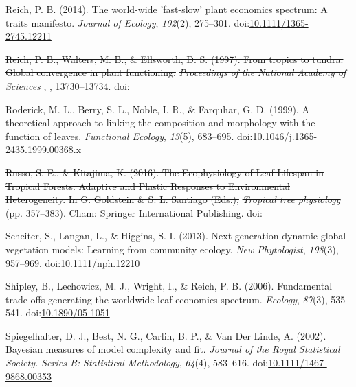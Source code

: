 \documentclass[12pt,]{article}
\theoremstyle{definition}
\theoremstyle{definition}
\theoremstyle{definition}
\theoremstyle{remark}
\providecommand{\DIFdeltex}[1]{{\protect\color{red}\sout{#1}}}                      %
\providecommand{\DIFdelbegin}{} %
\providecommand{\DIFdelend}{} %
\providecommand{\DIFdel}[1]{\texorpdfstring{\DIFdeltex{#1}}{}} %
\newcommand{\DIFscaledelfig}{0.5}
\newlength{\DIFdelgraphicswidth} %
\newlength{\DIFdelgraphicsheight} %
\newcommand{\DIFdelincludegraphics}[2][]{%
\sbox{\DIFdelgraphicsbox}{\DIFOincludegraphics[#1]{#2}}%
\settoboxwidth{\DIFdelgraphicswidth}{\DIFdelgraphicsbox} %
\settoboxtotalheight{\DIFdelgraphicsheight}{\DIFdelgraphicsbox} %
\scalebox{\DIFscaledelfig}{%
\parbox[b]{\DIFdelgraphicswidth}{\usebox{\DIFdelgraphicsbox}\\[-\baselineskip] \rule{\DIFdelgraphicswidth}{0em}}\llap{\resizebox{\DIFdelgraphicswidth}{\DIFdelgraphicsheight}{%
\setlength{\unitlength}{\DIFdelgraphicswidth}%
\begin{picture}(1,1)%
\thicklines\linethickness{2pt} %
{\color[rgb]{1,0,0}\put(0,0){\framebox(1,1){}}}%
{\color[rgb]{1,0,0}\put(0,0){\line( 1,1){1}}}%
{\color[rgb]{1,0,0}\put(0,1){\line(1,-1){1}}}%
\end{picture}%
}\hspace*{3pt}}} %
} %
\DeclareRobustCommand{\DIFdelbegin}{\DIFOdelbegin \let\includegraphics\DIFdelincludegraphics} %
\DeclareRobustCommand{\DIFdelend}{\DIFOaddend \let\includegraphics\DIFOincludegraphics} %
\begin{document}
\begin{itemize}
\leavevmode\hypertarget{ref-Reich2014}{}%
Reich, P. B. (2014). The world-wide 'fast-slow' plant economics
spectrum: A traits manifesto. \emph{Journal of Ecology}, \emph{102}(2),
275--301.
doi:\href{https://doi.org/10.1111/1365-2745.12211}{10.1111/1365-2745.12211}

\leavevmode\DIFdelbegin %
\DIFdel{Reich, P. B., Walters, M. B., \& Ellsworth, D. S. (1997). From tropics
to tundra: Global convergence in plant functioning. }\emph{\DIFdel{Proceedings of
the National Academy of Sciences}}%
\DIFdel{, }%
\DIFdel{, 13730--13734.
doi:}%

\DIFdelend \hypertarget{ref-Roderick1999}{}%
Roderick, M. L., Berry, S. L., Noble, I. R., \& Farquhar, G. D. (1999).
A theoretical approach to linking the composition and morphology with
the function of leaves. \emph{Functional Ecology}, \emph{13}(5),
683--695.
doi:\href{https://doi.org/10.1046/j.1365-2435.1999.00368.x}{10.1046/j.1365-2435.1999.00368.x}

\leavevmode\DIFdelbegin %
\DIFdel{Russo, S. E., \& Kitajima, K. (2016). The Ecophysiology of Leaf Lifespan
in Tropical Forests: Adaptive and Plastic Responses to Environmental
Heterogeneity. In G. Goldstein \& S. L. Santiago (Eds.), }\emph{\DIFdel{Tropical
tree physiology}} %
\DIFdel{(pp. 357--383). Cham: Springer International
Publishing.
doi:}%

\DIFdelend \hypertarget{ref-Scheiter2013}{}%
Scheiter, S., Langan, L., \& Higgins, S. I. (2013). Next-generation
dynamic global vegetation models: Learning from community ecology.
\emph{New Phytologist}, \emph{198}(3), 957--969.
doi:\href{https://doi.org/10.1111/nph.12210}{10.1111/nph.12210}

\leavevmode\hypertarget{ref-Shipley2006}{}%
Shipley, B., Lechowicz, M. J., Wright, I., \& Reich, P. B. (2006).
Fundamental trade-offs generating the worldwide leaf economics spectrum.
\emph{Ecology}, \emph{87}(3), 535--541.
doi:\href{https://doi.org/10.1890/05-1051}{10.1890/05-1051}

\leavevmode\hypertarget{ref-Spiegelhalter2002}{}%
Spiegelhalter, D. J., Best, N. G., Carlin, B. P., \& Van Der Linde, A.
(2002). Bayesian measures of model complexity and fit. \emph{Journal of
the Royal Statistical Society. Series B: Statistical Methodology},
\emph{64}(4), 583--616.
doi:\href{https://doi.org/10.1111/1467-9868.00353}{10.1111/1467-9868.00353}


\end{itemize}
\end{document}
